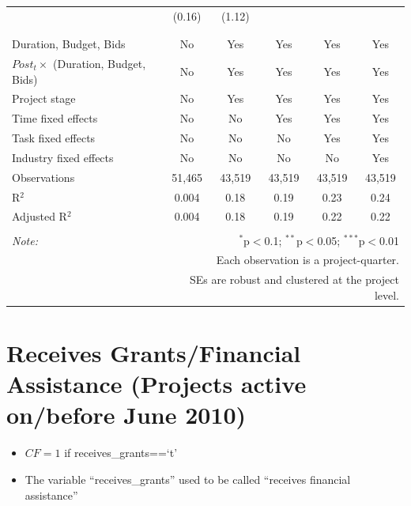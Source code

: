 \documentclass[
]{article}
\providecommand{\tightlist}{%
  \setlength{\itemsep}{0pt}\setlength{\parskip}{0pt}}
\begin{document}
\begin{table}[H]
\begin{tabular}{@{\extracolsep{-2pt}}lccccc}
  & (0.16) & (1.12) &  &  &  \\ 
  & & & & & \\ 
\hline \\[-1.8ex] 
Duration, Budget, Bids & No & Yes & Yes & Yes & Yes \\ 
$Post_t \times $  (Duration, Budget, Bids) & No & Yes & Yes & Yes & Yes \\ 
Project stage & No & Yes & Yes & Yes & Yes \\ 
Time fixed effects & No & No & Yes & Yes & Yes \\ 
Task fixed effects & No & No & No & Yes & Yes \\ 
Industry fixed effects & No & No & No & No & Yes \\ 
Observations & 51,465 & 43,519 & 43,519 & 43,519 & 43,519 \\ 
R$^{2}$ & 0.004 & 0.18 & 0.19 & 0.23 & 0.24 \\ 
Adjusted R$^{2}$ & 0.004 & 0.18 & 0.19 & 0.22 & 0.22 \\ 
\hline 
\hline \\[-1.8ex] 
\textit{Note:}  & \multicolumn{5}{r}{$^{*}$p$<$0.1; $^{**}$p$<$0.05; $^{***}$p$<$0.01} \\ 
 & \multicolumn{5}{r}{Each observation is a project-quarter.} \\ 
 & \multicolumn{5}{r}{SEs are robust and clustered at the project level.} \\ 
\end{tabular} 
\end{table}

\hypertarget{receives-grantsfinancial-assistance-projects-active-onbefore-june-2010}{%
\section{Receives Grants/Financial Assistance (Projects active on/before
June
2010)}\label{receives-grantsfinancial-assistance-projects-active-onbefore-june-2010}}

\begin{itemize}
\tightlist
\item
  \(CF=1\) if receives\_grants==`t'
\item
  The variable ``receives\_grants'' used to be called ``receives
  financial assistance''
\end{itemize}
\end{document}
